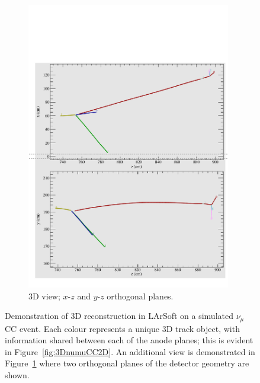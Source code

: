 \begin{figure}
  \hfill
  \begin{subfigure}[t]{0.48\linewidth}
    \centering
    \includegraphics[width=0.98\textwidth]{3DnumuCC3D.pdf}
    \caption{3D view; $x$-$z$ and $y$-$z$ orthogonal planes.}
    \label{fig:3DnumuCC3D}
  \end{subfigure}
  \caption[Demonstration of 3D reconstruction in LArSoft on a simulated $\nu_{\mu}$CC event.]{Demonstration of 3D reconstruction in LArSoft on a simulated $\nu_{\mu}$CC event.  Each colour represents a unique 3D track object, with information shared between each of the anode planes; this is evident in Figure~\ref{fig:3DnumuCC2D}.  An additional view is demonstrated in Figure~\ref{fig:3DnumuCC3D} where two orthogonal planes of the detector geometry are shown.}
  \label{fig:3DnumuCC}
\end{figure}

